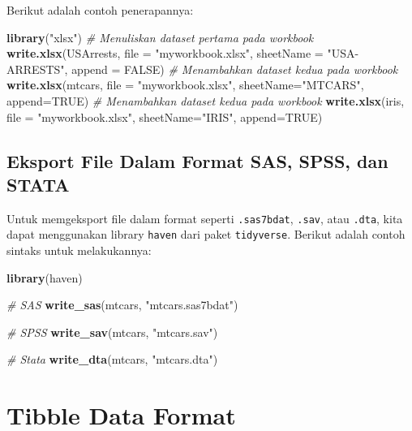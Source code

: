 \documentclass[]{book}
\newenvironment{Shaded}{\begin{snugshade}}{\end{snugshade}}
\newcommand{\KeywordTok}[1]{\textcolor[rgb]{0.13,0.29,0.53}{\textbf{#1}}}
\newcommand{\DataTypeTok}[1]{\textcolor[rgb]{0.13,0.29,0.53}{#1}}
\newcommand{\StringTok}[1]{\textcolor[rgb]{0.31,0.60,0.02}{#1}}
\newcommand{\CommentTok}[1]{\textcolor[rgb]{0.56,0.35,0.01}{\textit{#1}}}
\newcommand{\OtherTok}[1]{\textcolor[rgb]{0.56,0.35,0.01}{#1}}
\newcommand{\NormalTok}[1]{#1}
\begin{document}
Berikut adalah contoh penerapannya:

\begin{Shaded}
\begin{Highlighting}[]
\KeywordTok{library}\NormalTok{(}\StringTok{"xlsx"}\NormalTok{)}
\CommentTok{# Menuliskan dataset pertama pada workbook}
\KeywordTok{write.xlsx}\NormalTok{(USArrests, }\DataTypeTok{file =} \StringTok{"myworkbook.xlsx"}\NormalTok{,}
      \DataTypeTok{sheetName =} \StringTok{"USA-ARRESTS"}\NormalTok{, }\DataTypeTok{append =} \OtherTok{FALSE}\NormalTok{)}
\CommentTok{# Menambahkan dataset kedua pada workbook}
\KeywordTok{write.xlsx}\NormalTok{(mtcars, }\DataTypeTok{file =} \StringTok{"myworkbook.xlsx"}\NormalTok{, }
           \DataTypeTok{sheetName=}\StringTok{"MTCARS"}\NormalTok{, }\DataTypeTok{append=}\OtherTok{TRUE}\NormalTok{)}
\CommentTok{# Menambahkan dataset kedua pada workbook}
\KeywordTok{write.xlsx}\NormalTok{(iris, }\DataTypeTok{file =} \StringTok{"myworkbook.xlsx"}\NormalTok{,}
           \DataTypeTok{sheetName=}\StringTok{"IRIS"}\NormalTok{, }\DataTypeTok{append=}\OtherTok{TRUE}\NormalTok{)}
\end{Highlighting}
\end{Shaded}

\subsection{Eksport File Dalam Format SAS, SPSS, dan
STATA}\label{eksport-file-dalam-format-sas-spss-dan-stata}

Untuk memgeksport file dalam format seperti \texttt{.sas7bdat},
\texttt{.sav}, atau \texttt{.dta}, kita dapat menggunakan library
\texttt{haven} dari paket \texttt{tidyverse}. Berikut adalah contoh
sintaks untuk melakukannya:

\begin{Shaded}
\begin{Highlighting}[]
\KeywordTok{library}\NormalTok{(haven)}

\CommentTok{# SAS}
\KeywordTok{write_sas}\NormalTok{(mtcars, }\StringTok{"mtcars.sas7bdat"}\NormalTok{)}

\CommentTok{# SPSS}
\KeywordTok{write_sav}\NormalTok{(mtcars, }\StringTok{"mtcars.sav"}\NormalTok{)}

\CommentTok{# Stata}
\KeywordTok{write_dta}\NormalTok{(mtcars, }\StringTok{"mtcars.dta"}\NormalTok{)}
\end{Highlighting}
\end{Shaded}

\section{Tibble Data Format}\label{tibble-data-format}
\end{document}
